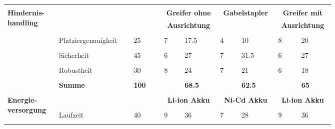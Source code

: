 \documentclass[main.tex]{subfiles} %
\begin{document}
\begin{landscape}
        \newpage
        \begin{table}[ht]
        \centering
            \begin{tabular}{|p{0.11\linewidth}|p{0.18\linewidth}|p{0.085\linewidth}|p{0.057\linewidth}|p{0.07\linewidth}|p{0.057\linewidth}|p{0.07\linewidth}|p{0.057\linewidth}|p{0.07\linewidth}|}
                \hline
                & \multicolumn{2}{c|}{} & \multicolumn{2}{c|}{} & \multicolumn{2}{c|}{} & \multicolumn{2}{c|}{} \\[-9pt]
                \multirow{6}{4em}{\textbf{Hindernis-handling}} & \multicolumn{2}{c|}{} & \multicolumn{2}{c|}{\textbf{Greifer ohne}} & \multicolumn{2}{c|}{\textbf{Gabelstapler}} & \multicolumn{2}{c|}{\textbf{Greifer mit}} \\[1pt]
                & \multicolumn{2}{c|}{} & \multicolumn{2}{c|}{\textbf{Ausrichtung}} & \multicolumn{2}{c|}{\textbf{}} & \multicolumn{2}{c|}{\textbf{Ausrichtung}} \\[1pt]
                \cline{2-9}
                &&&&&&&&\\[-9pt]
                & Platziergenauigkeit & 25 & 7 & 17.5 & 4 & 10 & 8 & 20 \\[1pt]
                \cline{2-9}
                &&&&&&&&\\[-9pt]
                & Sicherheit & 45 & 6 & 27 & 7 & 31.5 & 6 & 27 \\[1pt]
                \cline{2-9}
                &&&&&&&&\\[-9pt]
                & Robustheit & 30 & 8 & 24 & 7 & 21 & 6 & 18 \\[1pt]
                \cline{2-9}
                &&&&&&&&\\[-9pt]
                & \textbf{Summe} & \textbf{100} &  & \textbf{68.5} &  & \textbf{62.5} &  & \textbf{65} \\[1pt]
                \hline
                \hline
            & \multicolumn{2}{c|}{} & \multicolumn{2}{c|}{} & \multicolumn{2}{c|}{} & \multicolumn{2}{c|}{} \\[-9pt]
            \multirow{4}{4em}{\textbf{Energie-versorgung}} & \multicolumn{2}{c|}{} & \multicolumn{2}{c|}{\textbf{Li-ion Akku}} & \multicolumn{2}{c|}{\textbf{Ni-Cd Akku}} & \multicolumn{2}{c|}{\textbf{Li-ion Akku}} \\[1pt]
            \cline{2-9}
            &&&&&&&&\\[-9pt]
            & Laufzeit & 40 & 9 & 36 & 7 & 28 & 9 & 36 \\[1pt]
            \cline{2-9}
            &&&&&&&&\\[-9pt]

\end{tabular}
\end{table}
\end{landscape}
\end{document}
